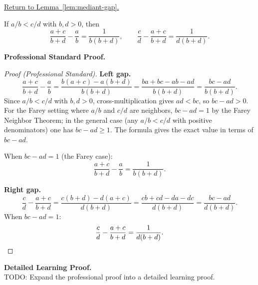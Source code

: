 
\newpage
{}
\label{prf:mediant-gap}

\begin{remark*}[Return]
\hyperref[lem:mediant-gap]{Return to Lemma~\ref*{lem:mediant-gap}.}
\end{remark*}

\begin{theorem*}
If $a/b < c/d$ with $b, d > 0$, then
\[
\frac{a+c}{b+d} - \frac{a}{b} = \frac{1}{b(b+d)},
\qquad
\frac{c}{d} - \frac{a+c}{b+d} = \frac{1}{d(b+d)}.
\]
\end{theorem*}

\textbf{Professional Standard Proof.}~\\
\begin{proof}
[Proof (Professional Standard)]
\textbf{Left gap.}
\[
\frac{a+c}{b+d} - \frac{a}{b}
= \frac{b(a+c) - a(b+d)}{b(b+d)}
= \frac{ba + bc - ab - ad}{b(b+d)}
= \frac{bc - ad}{b(b+d)}.
\]
Since $a/b < c/d$ with $b,d > 0$, cross-multiplication gives $ad < bc$,
so $bc - ad > 0$.  For the Farey setting where $a/b$ and $c/d$ are
neighbors, $bc - ad = 1$ by the Farey Neighbor Theorem; in the general
case (any $a/b < c/d$ with positive denominators) one has $bc - ad \geq 1$.
The formula gives the exact value in terms of $bc - ad$.

When $bc - ad = 1$ (the Farey case):
\[
\frac{a+c}{b+d} - \frac{a}{b} = \frac{1}{b(b+d)}.
\]

\textbf{Right gap.}
\[
\frac{c}{d} - \frac{a+c}{b+d}
= \frac{c(b+d) - d(a+c)}{d(b+d)}
= \frac{cb + cd - da - dc}{d(b+d)}
= \frac{bc - ad}{d(b+d)}.
\]
When $bc - ad = 1$:
\[
\frac{c}{d} - \frac{a+c}{b+d} = \frac{1}{d(b+d)}.
\qedhere
\]
\end{proof}

\textbf{Detailed Learning Proof.}~\\
TODO: Expand the professional proof into a detailed learning proof.



